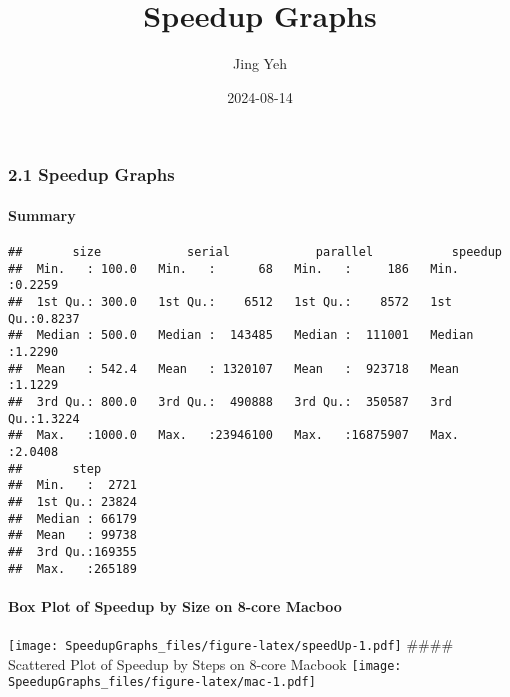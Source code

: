 \documentclass[
]{article}
\title{Speedup Graphs}
\author{Jing Yeh}
\date{2024-08-14}
\begin{document}
\maketitle

\subsubsection{2.1 Speedup Graphs}\label{speedup-graphs}

\paragraph{Summary}\label{summary}

\begin{verbatim}
##       size            serial            parallel           speedup      
##  Min.   : 100.0   Min.   :      68   Min.   :     186   Min.   :0.2259  
##  1st Qu.: 300.0   1st Qu.:    6512   1st Qu.:    8572   1st Qu.:0.8237  
##  Median : 500.0   Median :  143485   Median :  111001   Median :1.2290  
##  Mean   : 542.4   Mean   : 1320107   Mean   :  923718   Mean   :1.1229  
##  3rd Qu.: 800.0   3rd Qu.:  490888   3rd Qu.:  350587   3rd Qu.:1.3224  
##  Max.   :1000.0   Max.   :23946100   Max.   :16875907   Max.   :2.0408  
##       step       
##  Min.   :  2721  
##  1st Qu.: 23824  
##  Median : 66179  
##  Mean   : 99738  
##  3rd Qu.:169355  
##  Max.   :265189
\end{verbatim}

\paragraph{Box Plot of Speedup by Size on 8-core
Macboo}\label{box-plot-of-speedup-by-size-on-8-core-macboo}

\texttt{[image: SpeedupGraphs\_files/figure-latex/speedUp-1.pdf]}
\#\#\#\# Scattered Plot of Speedup by Steps on 8-core Macbook
\texttt{[image: SpeedupGraphs\_files/figure-latex/mac-1.pdf]} \newpage

\begin{verbatim}
\end{verbatim}
\end{document}
